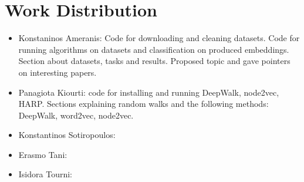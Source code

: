 \section{Work Distribution}
\begin{itemize}
\item Konstaninos Ameranis: Code for downloading and cleaning datasets. Code for running algorithms
on datasets and classification on produced embeddings. Section about datasets, tasks and
results. Proposed topic and gave pointers on interesting papers.
\item Panagiota Kiourti: code for installing and running DeepWalk, node2vec, HARP. Sections explaining random walks and the following methods: DeepWalk, word2vec, 
node2vec.
\item Konstantinos Sotiropoulos:
\item Erasmo Tani:
\item Isidora Tourni: 
\end{itemize}
